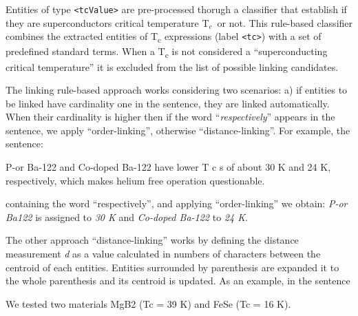 \documentclass[]{interact}
\theoremstyle{plain}%
\theoremstyle{definition}
\theoremstyle{remark}
\newcommand{\tc}{T$_{c}$}
\begin{document}
Entities of type \texttt{<tcValue>} are pre-processed thorugh a classifier that establish if they are superconductors critical temperature \tc~or not. 
This rule-based classifier combines the extracted entities of T\textsubscript{c} expressions (label \texttt{<tc>}) with a set of predefined standard terms. 
When a T\textsubscript{c} is not considered a ``superconducting critical temperature'' it is excluded from the list of possible linking candidates. 

The linking rule-based approach works considering two scenarios: a) if entities to be linked have cardinality one in the sentence, they are linked automatically. 
When their cardinality is higher then if the word ``\textit{respectively}'' appears in the sentence, we apply ``order-linking'', otherwise ``distance-linking''. 
For example, the sentence:  
\begin{displayquote}
P-or Ba-122  and Co-doped Ba-122 have lower T c s of about 30 K and 24 K, respectively, which makes helium free operation questionable.
\end{displayquote}
containing the word ``respectively'', and applying ``order-linking'' we obtain: \textit{P-or Ba122} is assigned to \textit{30 K} and \textit{Co-doped Ba-122} to \textit{24 K}.


The other approach ``distance-linking'' works by defining the distance measurement \textit{d} as a value calculated in numbers of characters between the centroid of each entities. 
Entities surrounded by parenthesis are expanded it to the whole parenthesis and its centroid is updated. 
As an example, in the sentence
\begin{displayquote}
We tested two materials MgB2 (Tc = 39 K) and FeSe (Tc = 16 K).
\end{displayquote}
\end{document}
